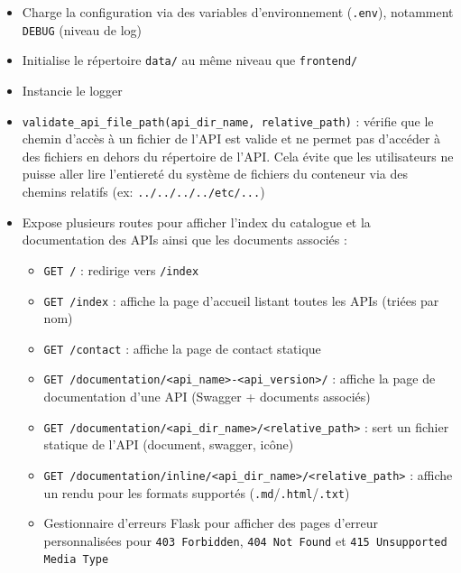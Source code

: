 \begin{itemize}
    \item[$\bullet$] Charge la configuration via des variables d'environnement (\texttt{.env}), notamment \texttt{DEBUG} (niveau de log)
    \item[$\bullet$] Initialise le répertoire \texttt{data/} au même niveau que \texttt{frontend/}
    \item[$\bullet$] Instancie le logger
    \item[$\bullet$] \texttt{validate\_api\_file\_path(api\_dir\_name, relative\_path)} : vérifie que le chemin d'accès à un fichier de l'API est valide et ne permet pas d'accéder à des fichiers en dehors du répertoire de l'API. Cela évite que les utilisateurs ne puisse aller lire l'entiereté du système de fichiers du conteneur via des chemins relatifs (ex: \texttt{../../../../etc/...})
    \item[$\bullet$] Expose plusieurs routes pour afficher l'index du catalogue et la documentation des APIs ainsi que les documents associés :
    \begin{itemize}
        \item[$\circ$] \texttt{GET /} : redirige vers \texttt{/index}
        \item[$\circ$] \texttt{GET /index} : affiche la page d'accueil listant toutes les APIs (triées par nom)
        \item[$\circ$] \texttt{GET /contact} : affiche la page de contact statique
        \item[$\circ$] \texttt{GET /documentation/<api\_name>-<api\_version>/} : affiche la page de documentation d'une API (Swagger + documents associés)
        \item[$\circ$] \texttt{GET /documentation/<api\_dir\_name>/<relative\_path>} : sert un fichier statique de l'API (document, swagger, icône)
        \item[$\circ$] \texttt{GET /documentation/inline/<api\_dir\_name>/<relative\_path>} : affiche un rendu pour les formats supportés (\texttt{.md}/\texttt{.html}/\texttt{.txt})
        \item[$\circ$] Gestionnaire d'erreurs Flask pour afficher des pages d'erreur personnalisées pour \texttt{403 Forbidden}, \texttt{404 Not Found} et \texttt{415 Unsupported Media Type}
    \end{itemize}
\end{itemize}


